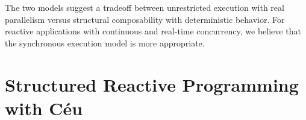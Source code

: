 \documentclass{acm_proc_article-sp}
\newcommand{\1}{\;}
\newcommand{\2}{\;\;}
\newcommand{\3}{\;\;\;}
\newcommand{\5}{\;\;\;\;\;}
\begin{document}
The two models suggest a tradeoff between unrestricted execution with real 
parallelism versus structural composability with deterministic behavior.
%
For reactive applications with continuous and real-time concurrency, we believe 
that the synchronous execution model is more appropriate.

\section{Structured Reactive Programming with C\'eu}
\label{sec.ceu}
\end{document}
